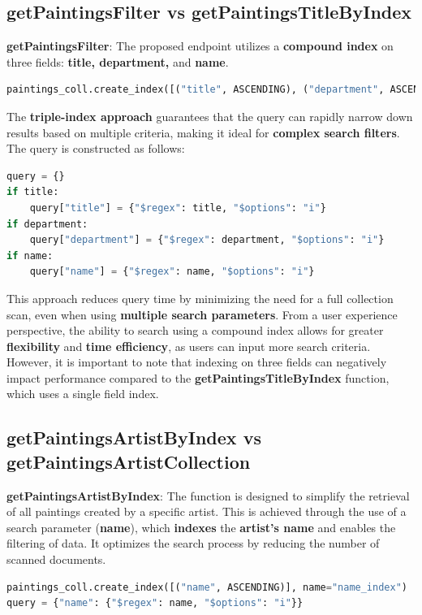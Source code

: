 \documentclass[a4paper,12pt]{article}
\begin{document}
\subsection{getPaintingsFilter vs getPaintingsTitleByIndex}
\textbf{getPaintingsFilter}: The proposed endpoint utilizes a \textbf{compound index} on three fields: \textbf{title, department,} and \textbf{name}.
\begin{lstlisting}[language=Python]
paintings_coll.create_index([("title", ASCENDING), ("department", ASCENDING), ("name", ASCENDING)], name="triple_index")
\end{lstlisting}
The \textbf{triple-index approach} guarantees that the query can rapidly narrow down results based on multiple criteria, making it ideal for \textbf{complex search filters}. The query is constructed as follows:
\begin{lstlisting}[language=Python]
query = {}
if title:
    query["title"] = {"$regex": title, "$options": "i"}
if department:
    query["department"] = {"$regex": department, "$options": "i"}
if name:
    query["name"] = {"$regex": name, "$options": "i"}
\end{lstlisting}
This approach reduces query time by minimizing the need for a full collection scan, even when using \textbf{multiple search parameters}. From a user experience perspective, the ability to search using a compound index allows for greater \textbf{flexibility} and \textbf{time efficiency}, as users can input more search criteria. However, it is important to note that indexing on three fields can negatively impact performance compared to the \textbf{getPaintingsTitleByIndex} function, which uses a single field index.

\subsection{getPaintingsArtistByIndex vs getPaintingsArtistCollection}
\textbf{getPaintingsArtistByIndex}: The function is designed to simplify the retrieval of all paintings created by a specific artist. This is achieved through the use of a search parameter (\textbf{name}), which \textbf{indexes} the \textbf{artist's name} and enables the filtering of data. It optimizes the search process by reducing the number of scanned documents.
\begin{lstlisting}[language=Python]
paintings_coll.create_index([("name", ASCENDING)], name="name_index")
query = {"name": {"$regex": name, "$options": "i"}}
\end{lstlisting}
\end{document}
